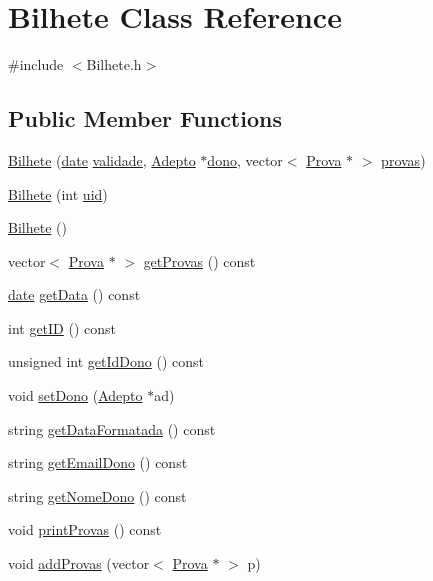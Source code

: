 \hypertarget{class_bilhete}{}\section{Bilhete Class Reference}
\label{class_bilhete}


{\ttfamily \#include $<$Bilhete.\+h$>$}

\subsection*{Public Member Functions}
\begin{DoxyCompactItemize}
\item 
\hyperlink{class_bilhete_abc0eccb3017774bf40eb09f25d63d008}{Bilhete} (\hyperlink{structdate}{date} \hyperlink{class_bilhete_adba6ea2eaaf920db79ed76698d7dcee6}{validade}, \hyperlink{class_adepto}{Adepto} $\ast$\hyperlink{class_bilhete_a10644168d3b284e0c4dad6c85e6a28ce}{dono}, vector$<$ \hyperlink{class_prova}{Prova} $\ast$ $>$ \hyperlink{class_bilhete_aac89dc945d1b4a00d296cec8d6a755d9}{provas})
\item 
\hyperlink{class_bilhete_ab7981f3702f74c570688bd9db2afc854}{Bilhete} (int \hyperlink{class_bilhete_a537bde09b332d1e4a06a8af3ad120732}{uid})
\item 
\hyperlink{class_bilhete_a3c69ddb7c2df72c5393fd4d155827086}{Bilhete} ()
\item 
vector$<$ \hyperlink{class_prova}{Prova} $\ast$ $>$ \hyperlink{class_bilhete_afdb4654e2a2b32102e67e7aec3bc14bb}{get\+Provas} () const 
\item 
\hyperlink{structdate}{date} \hyperlink{class_bilhete_a2261bf14cc65b43fa0312e15be051205}{get\+Data} () const 
\item 
int \hyperlink{class_bilhete_a10e93790a55f476b642630d76b7a0a26}{get\+I\+D} () const 
\item 
unsigned int \hyperlink{class_bilhete_ae9af9b7d7e95d09f1751d6954ab8485c}{get\+Id\+Dono} () const 
\item 
void \hyperlink{class_bilhete_ab9c561f39f792930691973f23b69c740}{set\+Dono} (\hyperlink{class_adepto}{Adepto} $\ast$ad)
\item 
string \hyperlink{class_bilhete_a81264c9ac5330e0c033e9ea8015653e1}{get\+Data\+Formatada} () const 
\item 
string \hyperlink{class_bilhete_a0906c4df61bb921c988ee076b35aa438}{get\+Email\+Dono} () const 
\item 
string \hyperlink{class_bilhete_a97571c40d6af971e66c28c82c1ba1235}{get\+Nome\+Dono} () const 
\item 
void \hyperlink{class_bilhete_a0a1c16bb609bb49d1a9a48e3d9ebce10}{print\+Provas} () const 
\item 
void \hyperlink{class_bilhete_a26fdc63b15aa11707a783b3c40ca22a6}{add\+Provas} (vector$<$ \hyperlink{class_prova}{Prova} $\ast$ $>$ p)
\end{DoxyCompactItemize}
